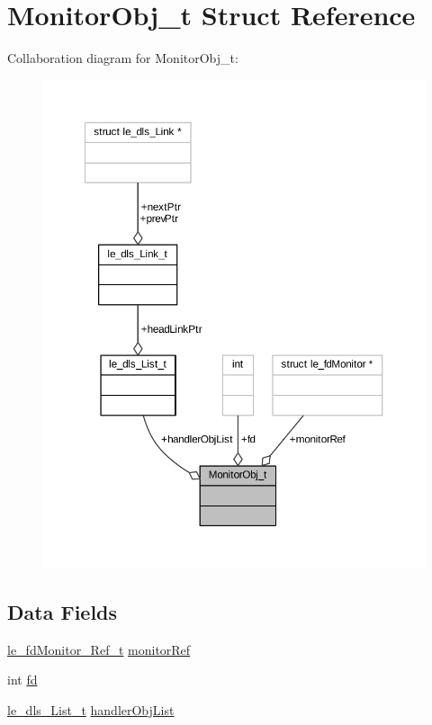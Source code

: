 \hypertarget{struct_monitor_obj__t}{}\section{Monitor\+Obj\+\_\+t Struct Reference}
\label{struct_monitor_obj__t}


Collaboration diagram for Monitor\+Obj\+\_\+t\+:
\nopagebreak
\begin{figure}[H]
\begin{center}
\leavevmode
\includegraphics[width=350pt]{struct_monitor_obj__t__coll__graph}
\end{center}
\end{figure}
\subsection*{Data Fields}
\begin{DoxyCompactItemize}
\item 
\hyperlink{le__fd_monitor_8h_a85048556f0b95147af81e76907895d42}{le\+\_\+fd\+Monitor\+\_\+\+Ref\+\_\+t} \hyperlink{struct_monitor_obj__t_a5f0df1aa043a0cc1dc346ae82975cdd0}{monitor\+Ref}
\item 
int \hyperlink{struct_monitor_obj__t_ae4e0e16b7fd09b21b9d274974b5bed9a}{fd}
\item 
\hyperlink{structle__dls___list__t}{le\+\_\+dls\+\_\+\+List\+\_\+t} \hyperlink{struct_monitor_obj__t_ae016d8a2a8ed7dbcbe75548abd24aca6}{handler\+Obj\+List}
\end{DoxyCompactItemize}


